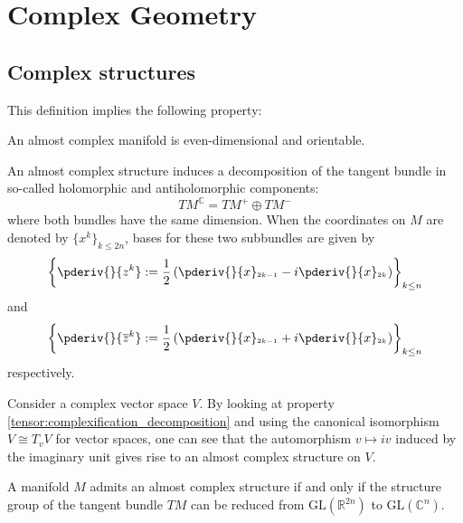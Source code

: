 \chapter{Complex Geometry}\label{chapter:complex_geometry}

\section{Complex structures}


    This definition implies the following property:
    \begin{property}
        An almost complex manifold is even-dimensional and orientable.
    \end{property}

    An almost complex structure induces a decomposition of the tangent bundle in so-called holomorphic and antiholomorphic components:\[TM^{\mathbb{C}} = TM^+\oplus TM^-\] where both bundles have the same dimension. When the coordinates on $M$ are denoted by $\{x^k\}_{k\leq 2n}$, bases for these two subbundles are given by \[\left\{\pderiv{}{z^k} := \frac{1}{2}\left(\pderiv{}{x}_{^{2k-1}} - i\pderiv{}{x}_{^{2k}}\right)\right\}_{k\leq n}\] and \[\left\{\pderiv{}{\overline{z}^k} := \frac{1}{2}\left(\pderiv{}{x}_{^{2k-1}} + i\pderiv{}{x}_{^{2k}}\right)\right\}_{k\leq n}\] respectively.


    \begin{example}
        Consider a complex vector space $V$. By looking at property \ref{tensor:complexification_decomposition} and using the canonical isomorphism $V\cong T_vV$ for vector spaces, one can see that the automorphism $v\mapsto iv$ induced by the imaginary unit gives rise to an almost complex structure on $V$.
    \end{example}

    \begin{property}
        A manifold $M$ admits an almost complex structure if and only if the structure group of the tangent bundle $TM$ can be reduced from $\text{GL}(\mathbb{R}^{2n})$ to $\text{GL}(\mathbb{C}^n)$.
    \end{property}

